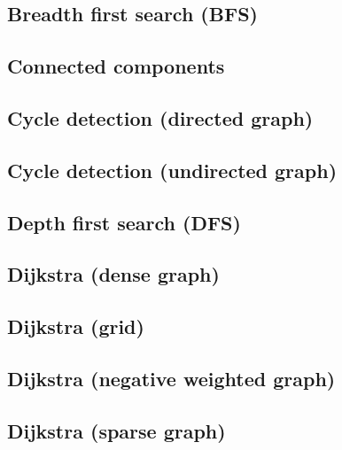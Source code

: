 \subsection{Breadth first search (BFS)}
\raggedbottom
\hrulefill
\subsection{Connected components}
\raggedbottom
\hrulefill
\subsection{Cycle detection (directed graph)}
\raggedbottom
\hrulefill
\subsection{Cycle detection (undirected graph)}
\raggedbottom
\hrulefill
\subsection{Depth first search (DFS)}
\raggedbottom
\hrulefill
\subsection{Dijkstra (dense graph)}
\raggedbottom
\hrulefill
\subsection{Dijkstra (grid)}
\raggedbottom
\hrulefill
\subsection{Dijkstra (negative weighted graph)}
\raggedbottom
\hrulefill
\subsection{Dijkstra (sparse graph)}
\raggedbottom
\hrulefill
